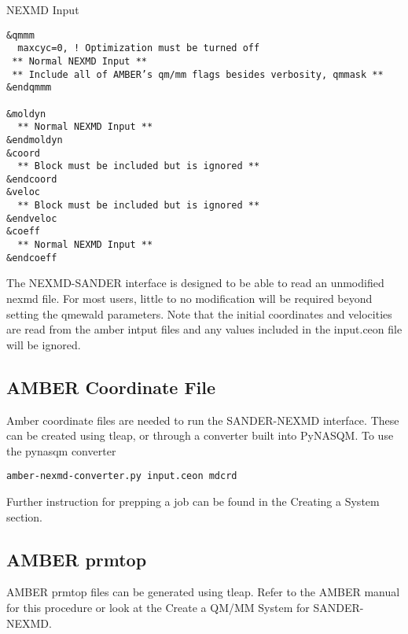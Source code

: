 \documentclass[11pt]{article}
\begin{document}
NEXMD Input 

\begin{verbatim}
&qmmm 
  maxcyc=0, ! Optimization must be turned off
 ** Normal NEXMD Input **  
 ** Include all of AMBER’s qm/mm flags besides verbosity, qmmask ** 
&endqmmm 

&moldyn 
  ** Normal NEXMD Input ** 
&endmoldyn 
&coord 
  ** Block must be included but is ignored ** 
&endcoord 
&veloc 
  ** Block must be included but is ignored ** 
&endveloc 
&coeff 
  ** Normal NEXMD Input ** 
&endcoeff 
\end{verbatim}

The NEXMD-SANDER interface is designed to be able to read an unmodified nexmd
file. For most users, little to no modification will be required beyond setting
the qmewald parameters. Note that the initial coordinates and velocities are
read from the amber intput files and any values included in the input.ceon file
will be ignored.

\subsection{AMBER Coordinate File}
\label{sec:orgaaf5152}

Amber coordinate files are needed to run the SANDER-NEXMD interface. These can
be created using tleap, or through a converter built into PyNASQM. To use the
pynasqm converter

\begin{verbatim}
amber-nexmd-converter.py input.ceon mdcrd
\end{verbatim}

Further instruction for prepping a job can be found in the Creating a System
section.

\subsection{AMBER prmtop}
\label{sec:org91f68d5}

AMBER prmtop files can be generated using tleap. Refer to the AMBER manual for
this procedure or look at the Create a QM/MM System for SANDER-NEXMD.
\end{document}
